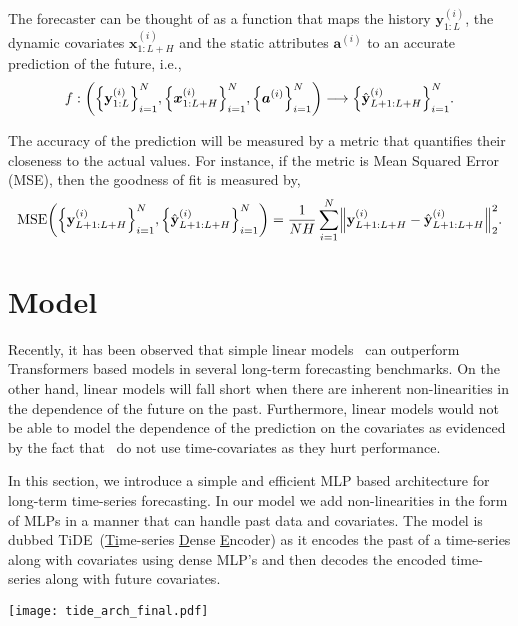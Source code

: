 \documentclass[10pt]{article} \usepackage[accepted]{tmlr}
\theoremstyle{plain}
\theoremstyle{definition}
\theoremstyle{remark}
\newcommand{\ab}{{\bm{a}}}
\newcommand{\xb}{{\bm{x}}}
\newcommand{\ba}{\ab}
\newcommand{\bx}{\xb}
\let\originalleft\left
\let\originalright\right
\renewcommand{\left}{\mathopen{}\mathclose\bgroup\originalleft}
\renewcommand{\right}{\aftergroup\egroup\originalright}
\newcommand{\norm}[1]{\left\|{#1}\right\|}
\def\*#1{\mathbf{#1}}
\newcommand{\ours}{TiDE}
\begin{document}
The forecaster can be thought of as a function that maps the history $\*y^{(i)}_{1:L}$, the dynamic covariates $\bx^{(i)}_{1:L+H}$ and the static attributes  $\ba^{(i)}$ to an accurate prediction of the future, i.e.,
\begin{equation}
    f: \left( \left\{\*y^{(i)}_{1:L}\right\}_{i=1}^{N}, \left\{\bx^{(i)}_{1:L+H}\right\}_{i=1}^{N}, \left\{\ba^{(i)}\right\}_{i=1}^N \right) \longrightarrow \left\{\hat{\*y}^{(i)}_{L+1:L+H}\right\}_{i=1}^{N}.
    \label{eq:all}
\end{equation}

The accuracy of the prediction will be measured by a metric that quantifies their closeness to the actual values. For instance, if the metric is Mean Squared Error (MSE), then the goodness of fit is measured by,
\begin{align}
    \mathrm{MSE} \left(\left\{\*y^{(i)}_{L+1:L+H}\right\}_{i=1}^{N},  \left\{\hat{\*y}^{(i)}_{L+1:L+H}\right\}_{i=1}^{N}\right) = \frac{1}{NH} \sum_{i=1}^{N}\norm{\*y^{(i)}_{L+1:L+H} - \hat{\*y}^{(i)}_{L+1:L+H}}_2^2.
    \label{eq:mse}
\end{align}
 
\section{Model}
\label{sec:model}

Recently, it has been observed that simple linear models~\citep{zeng2022transformers} can outperform Transformers based models in several long-term forecasting benchmarks. On the other hand, linear models will fall short when there are inherent non-linearities in the dependence of the future on the past. Furthermore, linear models would not be able to model the dependence of the prediction on the covariates as evidenced by the fact that~\citep{zeng2022transformers} do not use time-covariates as they hurt performance. 

In this section, we introduce a simple and efficient MLP based architecture for long-term time-series forecasting. In our model we add non-linearities in the form of MLPs in a manner that can handle past data and covariates. The model is dubbed \ours~(\underline{Ti}me-series \underline{D}ense \underline{E}ncoder) as it encodes the past of a time-series along with covariates using dense MLP's and then decodes the encoded time-series along with future covariates.

\begin{figure*}[tbh!]
    \centering
    \texttt{[image: tide\_arch\_final.pdf]}
    \caption{Overview of TiDE architecture. The dynamic covariates per time-point are mapped to a lower dimensional space using a feature projection step. Then the encoder combines the look-back along with the projected covariates with the static attributes to form an encoding. The decoder maps this encoding to a vector per time-step in the horizon. Then a temporal decoder combines this vector (per time-step) with the projected features of that time-step in the horizon to form the final predictions. We also add a global linear residual connection from the look-back to the horizon.}
    \label{fig:arch}
\end{figure*}
\end{document}
